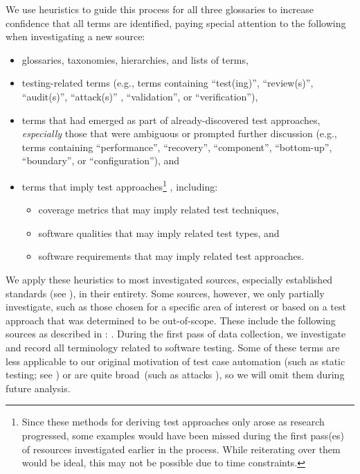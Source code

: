 We use heuristics to guide this process for all three
glossaries to increase confidence that all terms are identified, paying
special attention to the following when investigating a new source:
\begin{itemize}
    \item glossaries, taxonomies, hierarchies, and lists of terms,
    \item testing-related terms (e.g., terms containing ``test(ing)'',
          \ifnotpaper ``review(s)'', ``audit(s)'', ``attack(s)''%
              , \fi ``validation'', or ``verification''),
    \item terms that had emerged as part of already-discovered
          test approaches, \emph{especially} those that were ambiguous
          or prompted further discussion (e.g., terms containing
          ``performance'', ``recovery'', ``component'', ``bottom-up'',
          \ifnotpaper ``boundary'', \fi or ``configuration''), and
    \item terms that imply test approaches\ifnotpaper\footnote{
                  Since these methods for deriving test approaches only arose
                  as research progressed, some examples would have been missed
                  during the first pass(es) of resources investigated earlier
                  in the process. While reiterating over them would be ideal,
                  this may not be possible due to time constraints.
              }%
          \fi, including:
          \newcommand\derivTest[2]{#1 that may imply \ifnotpaper related \fi test #2}
          \begin{itemize}
              \item \derivTest{coverage metrics}{techniques},
              \item \derivTest{software qualities}{types}, and
              \item \derivTest{\ifnotpaper software \fi requirements}{approaches}.
          \end{itemize}
\end{itemize}
We apply these heuristics to most investigated sources, especially established
standards (see ), in their entirety. Some sources, however, we only
partially investigate, such as those chosen for a specific area of
interest or based on a test approach that was determined to be out-of-scope.
These include the following sources as described in :
\citet{ISO2022,ISO2015,Dominguez-PumarEtAl2020,PierreEtAl2017,
    TrudnowskiEtAl2017,YuEtAl2011,Tsui2007,Goralski1999}.
During the first pass of data collection, we investigate and record all
terminology related to software testing. Some of these terms are less
applicable to our original motivation of test case automation \ifnotpaper
    (such as static testing; see ) \fi or
are quite broad\ifnotpaper\ (such as attacks%
    )\fi, so we will omit them during future analysis.

